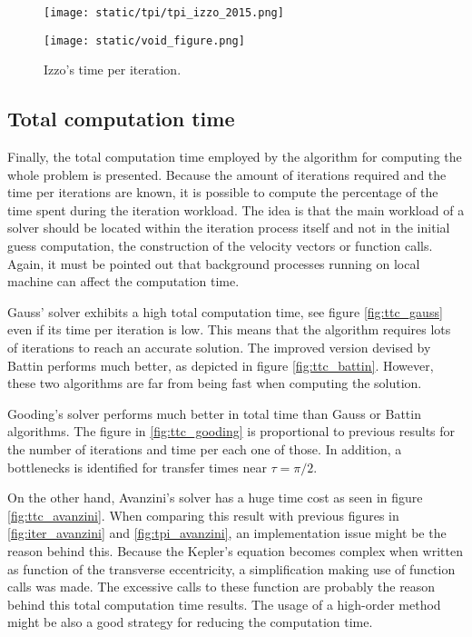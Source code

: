 \begin{figure}[H]
  \begin{minipage}{0.48\textwidth}
    \centering
    \texttt{[image: static/tpi/tpi\_izzo\_2015.png]}
    \caption{Izzo's time per iteration.}\label{fig:tpi_izzo}
  \end{minipage}\hfill
  \begin{minipage}{0.48\textwidth}
    \centering
    \texttt{[image: static/void\_figure.png]}
  \end{minipage}
\end{figure}


\subsection{Total computation time}

Finally, the total computation time employed by the algorithm for computing the
whole problem is presented. Because the amount of iterations required and the
time per iterations are known, it is possible to compute the percentage of the
time spent during the iteration workload. The idea is that the main workload of
a solver should be located within the iteration process itself and not in the
initial guess computation, the construction of the velocity vectors or function
calls. Again, it must be pointed out that background processes running on local
machine can affect the computation time. 

Gauss' solver exhibits a high total computation time, see figure
\ref{fig:ttc_gauss} even if its time per iteration is low. This means that the
algorithm requires lots of iterations to reach an accurate solution. The
improved version devised by Battin performs much better, as depicted in figure
\ref{fig:ttc_battin}. However, these two algorithms are far from being fast when
computing the solution.

Gooding's solver performs much better in total time than Gauss or Battin
algorithms. The figure in \ref{fig:ttc_gooding} is proportional to previous
results for the number of iterations and time per each one of those. In
addition, a bottlenecks is identified for transfer times near $\tau=\pi/2$.

On the other hand, Avanzini's solver has a huge time cost as seen in figure
\ref{fig:ttc_avanzini}. When comparing this result with previous figures in
\ref{fig:iter_avanzini} and \ref{fig:tpi_avanzini}, an implementation issue
might be the reason behind this. Because the Kepler's equation becomes complex
when written as function of the transverse eccentricity, a simplification making
use of function calls was made. The excessive calls to these function are
probably the reason behind this total computation time results. The usage of a
high-order method might be also a good strategy for reducing the computation time.

